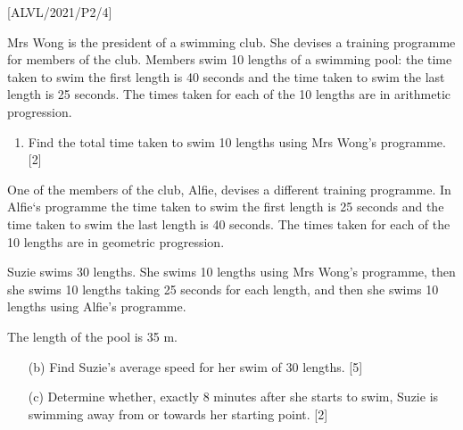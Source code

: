\item {[}ALVL/2021/P2/4{]}

Mrs Wong is the president of a swimming club. She devises a training
programme for members of the club. Members swim 10 lengths of a swimming
pool: the time taken to swim the first length is 40 seconds and the
time taken to swim the last length is 25 seconds. The times taken
for each of the 10 lengths are in arithmetic progression.
\begin{enumerate}
\item Find the total time taken to swim 10 lengths using Mrs Wong's programme.
\hfill{}{[}2{]} 
\end{enumerate}
One of the members of the club, Alfie, devises a different training
programme. In Alfie\textquoteleft s programme the time taken to swim
the first length is 25 seconds and the time taken to swim the last
length is 40 seconds. The times taken for each of the 10 lengths are
in geometric progression. 

Suzie swims 30 lengths. She swims 10 lengths using Mrs Wong's programme,
then she swims 10 lengths taking 25 seconds for each length, and then
she swims 10 lengths using Alfie's programme.

The length of the pool is 35 m.
\begin{enumerate}
\item[(b)]  Find Suzie's average speed for her swim of 30 lengths. \hfill{}{[}5{]}
\item[(c)]  Determine whether, exactly 8 minutes after she starts to swim, Suzie
is swimming away from or towards her starting point. \hfill{}{[}2{]}
\end{enumerate}
